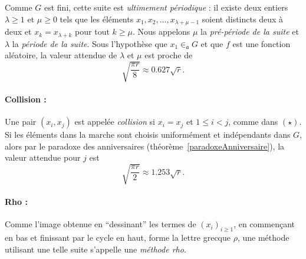 \documentclass[a4paper, titlepage]{article}
\theoremstyle{definition}
\theoremstyle{remark}
\begin{document}
Comme $G$ est fini, cette suite est \textit{ultimement périodique} : il existe deux entiers $\lambda \geqslant 1$ et $\mu \geqslant 0$ tels que les éléments $x_1, x_2, \dots, x_{\lambda + \mu -1}$ soient distincts deux à deux et $x_{k} = x_{\lambda + k}$ pour tout $k\geqslant \mu$. Nous appelons $\mu$ la \textit{pré-période de la suite} et $\lambda$ la \textit{période de la suite}. Sous l'hypothèse que $x_1 \in_\mathfrak{a} G$ et que $f$ est une fonction aléatoire, la valeur attendue de $\lambda$ et $\mu$ est proche de $$\sqrt{\frac{\pi r}{8}} \approx 0.627 \sqrt{r}.$$

\paragraph*{Collision :} Une pair $(x_i, x_j)$ est appelée \textit{collision} si $x_i = x_j$ et $1 \leqslant i < j$, comme dans $(\star)$. Si les éléments dans la marche sont choisis uniformément et indépendants dans $G$, alors par le paradoxe des anniversaires (théorème~\ref{paradoxeAnniversaire}), la valeur attendue pour $j$ est $$\sqrt{\frac{\pi r}{2}} \approx 1.253 \sqrt{r}.$$

\paragraph*{Rho :} Comme l'image obtenue en ``dessinant'' les termes de ${(x_i)}_{i\geqslant 1}$, en commençant en bas et finissant par le cycle en haut, forme la lettre grecque $\rho$, une méthode utilisant une telle suite s'appelle une \textit{méthode rho}.
\end{document}
